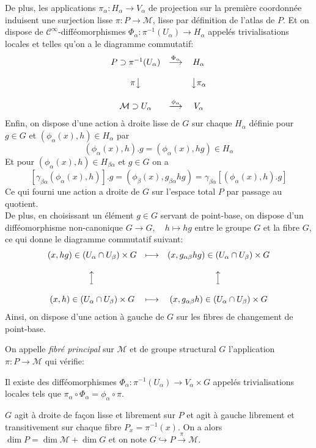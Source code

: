 \documentclass[12pt, a4paper]{book}
\begin{document}
De plus, les applications $\pi_\alpha: H_\alpha \to V_\alpha$ de projection sur la première coordonnée induisent une surjection lisse $\pi : P \to \mathcal{M}$, lisse par définition de l'atlas de $P$. Et on dispose de $\mathscr{C}^\infty$-difféomorphismes $\Phi_\alpha : \pi^{-1}(U_\alpha) \to H_\alpha$ appelés trivialisations locales et telles qu'on a le diagramme commutatif:
$$\begin{matrix}
P \supset \pi^{-1}(U_\alpha) & \overset{\Phi_\alpha}{\longrightarrow} & H_\alpha \\ \\
\pi\big\downarrow &  & \big\downarrow\pi_\alpha \\ \\
\mathcal{M} \supset U_\alpha & \overset{\phi_\alpha}{\longrightarrow} & V_\alpha 
\end{matrix}
$$
Enfin, on dispose d'une action à droite lisse de $G$ sur chaque $H_\alpha$ définie pour $g\in G$ et $(\phi_\alpha(x), h)\in H_\alpha$ par 
$$(\phi_\alpha(x), h).g = (\phi_\alpha(x), hg) \in H_\alpha$$
Et pour $(\phi_\alpha(x), h) \in H_{\beta\alpha}$ et $g\in G$ on a 
$$[\gamma_{\beta\alpha}(\phi_\alpha(x), h)].g = (\phi_\beta(x), g_{\beta\alpha}hg) = \gamma_{\beta\alpha}[(\phi_\alpha(x), h).g]$$ 
Ce qui fourni une action a droite de $G$ sur l'espace total $P$ par passage au quotient. \\

De plus, en choisissant un élément $g\in G$ servant de point-base, on dispose d'un difféomorphisme non-canonique $G \to G, \quad h \mapsto hg$ entre le groupe $G$ et la fibre $G$, ce qui donne le diagramme commutatif suivant:
$$\begin{matrix}
(x, hg) \in (U_\alpha \cap U_\beta) \times G & \longmapsto & (x, g_{\alpha\beta}hg) \in (U_\alpha \cap U_\beta) \times G\\ \\
\upmapsto &  & \upmapsto \\ \\
(x, h) \in (U_\alpha \cap U_\beta) \times G & \longmapsto & (x, g_{\alpha\beta}h) \in (U_\alpha \cap U_\beta) \times G
\end{matrix}
$$
Ainsi, on dispose d'une action à gauche de $G$ sur les fibres de changement de point-base. \\

\begin{defi}
On appelle \emph{fibré principal} sur $\mathcal{M}$ et de groupe structural $G$ l'application $\pi: P \to \mathcal{M}$ qui vérifie:
\be 
	\item Il existe des difféomorphismes $\Phi_\alpha : \pi^{-1}(U_\alpha) \to V_\alpha \times G$ appelés trivialisations locales tels que $\pi_\alpha \circ \Phi_\alpha = \phi_\alpha \circ \pi$. 
	\item $G$ agit à droite de façon lisse et librement sur $P$ et agit à gauche librement et transitivement sur chaque fibre $P_x = \pi^{-1}(x)$.
\ee
On a alors $\dim P = \dim \mathcal{M} + \dim G$ et on note $G \hookrightarrow P \overset{\pi}{\to} \mathcal{M}$.
\end{defi}
\end{document}
